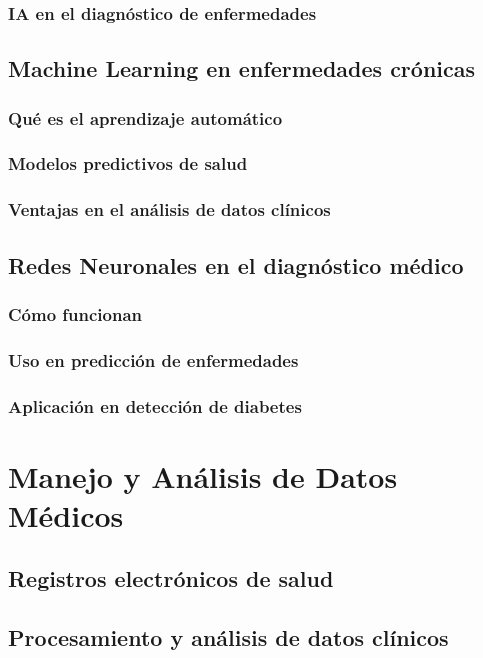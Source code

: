 \subsubsection{IA en el diagn\'ostico de enfermedades}

\subsection{Machine Learning en enfermedades cr\'onicas}
\subsubsection{Qu\'e es el aprendizaje autom\'atico}
\subsubsection{Modelos predictivos de salud}
\subsubsection{Ventajas en el an\'alisis de datos cl\'inicos}

\subsection{Redes Neuronales en el diagn\'ostico m\'edico}
\subsubsection{C\'omo funcionan}
\subsubsection{Uso en predicci\'on de enfermedades}
\subsubsection{Aplicaci\'on en detecci\'on de diabetes}


\section{Manejo y An\'alisis de Datos M\'edicos}

\subsection{Registros electr\'onicos de salud}
\subsection{Procesamiento y an\'alisis de datos cl\'inicos}
